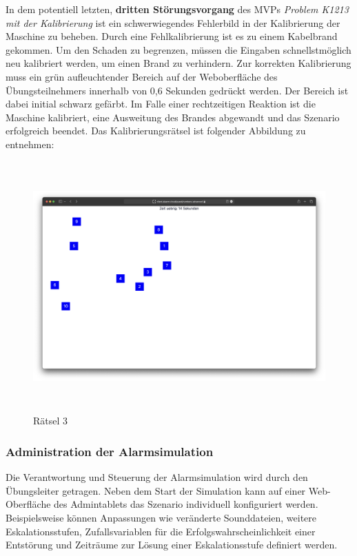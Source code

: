 In dem potentiell letzten, \textbf{dritten Störungsvorgang} des MVPs \textit{Problem K1213 mit der Kalibrierung} ist ein schwerwiegendes Fehlerbild in der Kalibrierung der Maschine zu beheben. Durch eine Fehlkalibrierung ist es zu einem Kabelbrand gekommen. Um den Schaden zu begrenzen, müssen die Eingaben schnellstmöglich neu kalibriert werden, um einen Brand zu verhindern. Zur korrekten Kalibrierung muss ein grün aufleuchtender Bereich auf der Weboberfläche des Übungsteilnehmers innerhalb von 0,6 Sekunden gedrückt werden. Der Bereich ist dabei initial schwarz gefärbt. Im Falle einer rechtzeitigen Reaktion ist die Maschine kalibriert, eine Ausweitung des Brandes abgewandt und das Szenario erfolgreich beendet. Das Kalibrierungsrätsel ist folgender Abbildung zu entnehmen:

\begin{figure}[H]
   \includegraphics[width=15cm, height=9.61cm]{res/quest_02.png}
   \caption{Rätsel 3}
\end{figure}

\subsubsection{Administration der Alarmsimulation}

Die Verantwortung und Steuerung der Alarmsimulation wird durch den Übungsleiter getragen. Neben dem Start der Simulation kann auf einer Web-Oberfläche des Admintablets das Szenario individuell konfiguriert werden. Beispielsweise können Anpassungen wie veränderte Sounddateien, weitere Eskalationsstufen, Zufallsvariablen für die Erfolgswahrscheinlichkeit einer Entstörung und Zeiträume zur Lösung einer Eskalationsstufe definiert werden.


